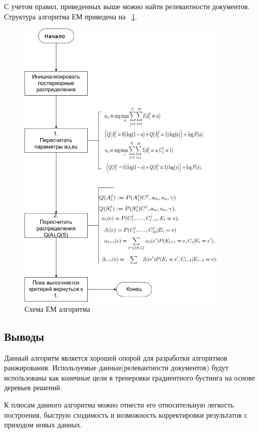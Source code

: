 С учетом правил, приведенных выше можно найти релевантности документов. Структура алгоритма ЕМ приведена на ~\ref{em-picture}.

\begin{figure}
  \centering
  \includegraphics[width=0.9\textwidth]{images/em_new.jpg}
  \caption{Схема ЕМ алгоритма\label{em-picture}}
\end{figure}

\subsection{Выводы}
 
 Данный алгоритм является хорошей опорой для разработки алгоритмов ранжирования. Используемые данные(релевантности документов) будут использованы как конечные цели в тренеровки градиентного бустинга на основе деревьев решений.

К плюсам данного алгоритма можно отнести его относительную легкость построения, быструю сходимость и возможность корректировки результатов с приходом новых данных.

\newpage